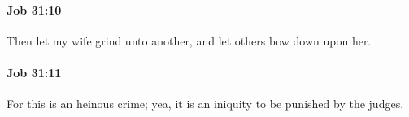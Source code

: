 		\paragraph{Job 31:10} %
			\label{JOB-31-10}

			Then let my wife grind unto another, and let others bow down upon her.


		\paragraph{Job 31:11} %
			\label{JOB-31-11}

			For this is an heinous crime; yea, it is an iniquity to be punished by the judges.


